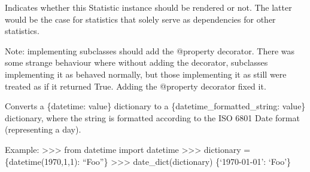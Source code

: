 \documentclass[letterpaper,10pt,english]{sphinxmanual}
\begin{document}
\begin{fulllineitems}
\begin{fulllineitems}
\end{fulllineitems}


\begin{fulllineitems}
\label{\detokenize{pydash_app.dashboard.aggregator.statistics:pydash_app.dashboard.aggregator.statistics.VisitsPerIP.rendered_value}}
\end{fulllineitems}


\begin{fulllineitems}
\label{\detokenize{pydash_app.dashboard.aggregator.statistics:pydash_app.dashboard.aggregator.statistics.VisitsPerIP.should_be_rendered}}
Indicates whether this Statistic instance should be rendered or not. The latter would be the case for statistics
that solely serve as dependencies for other statistics.

Note: implementing subclasses should add the @property decorator.
There was some strange behaviour where without adding the decorator,
subclasses implementing it as  behaved normally, but those implementing it as  still
were treated as if it returned True. Adding the @property decorator fixed it.

\end{fulllineitems}


\end{fulllineitems}


\begin{fulllineitems}
\label{\detokenize{pydash_app.dashboard.aggregator.statistics:pydash_app.dashboard.aggregator.statistics.date_dict}}
Converts a \{datetime: value\} dictionary to a \{datetime\_formatted\_string: value\} dictionary,
where the string is formatted according to the ISO 6801 Date format (representing a day).

Example:
\textgreater{}\textgreater{}\textgreater{} from datetime import datetime
\textgreater{}\textgreater{}\textgreater{} dictionary = \{datetime(1970,1,1): “Foo”\}
\textgreater{}\textgreater{}\textgreater{} date\_dict(dictionary)
\{‘1970-01-01’: ‘Foo’\}

\end{fulllineitems}
\end{document}
